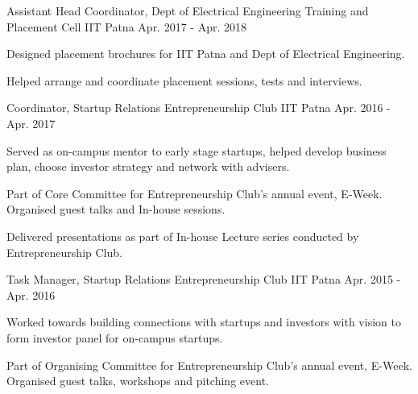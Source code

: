 
\begin{cvpositions}

\cvrole
	{Assistant Head Coordinator, Dept of Electrical Engineering} %
	{Training and Placement Cell} %
	{IIT Patna} %
	{Apr. 2017 - Apr. 2018} %
	{\begin{cvitems} %
		\item {Designed placement brochures for IIT Patna and Dept of Electrical Engineering.}
		\item {Helped arrange and coordinate placement sessions, tests and interviews.}
	\end{cvitems}}

\cvrole
	{Coordinator, Startup Relations} %
	{Entrepreneurship Club} %
	{IIT Patna} %
	{Apr. 2016 - Apr. 2017} %
	{\begin{cvitems} %
		\item {Served as on-campus mentor to early stage startups, helped develop business plan, choose investor strategy and network with advisers.}
		\item {Part of Core Committee for Entrepreneurship Club's annual event, E-Week. Organised guest talks and In-house sessions.}
		\item {Delivered presentations as part of In-house Lecture series conducted by Entrepreneurship Club.}
	\end{cvitems}}

\cvrole
	{Task Manager, Startup Relations} %
	{Entrepreneurship Club} %
	{IIT Patna} %
	{Apr. 2015 - Apr. 2016} %
	{\begin{cvitems} %
		\item {Worked towards building connections with startups and investors with vision to form investor panel for on-campus startups.}
		\item {Part of Organising Committee for Entrepreneurship Club's annual event, E-Week. Organised guest talks, workshops and pitching event.}
	\end{cvitems}}

\end{cvpositions}
